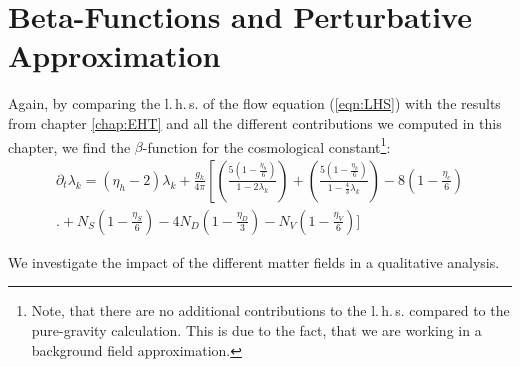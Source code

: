\section{Beta-Functions and Perturbative Approximation}
Again, by comparing the l.\,h.\,s. of the flow equation (\ref{eqn:LHS}) with the results from chapter \ref{chap:EHT} and all the different contributions we computed in this chapter, we find the $\beta$-function for the cosmological constant\footnote{Note, that there are no additional contributions to the l.\,h.\,s. compared to the pure-gravity calculation. This is due to the fact, that we are working in a background field approximation.}:
\begin{equation}
\begin{aligned}
	\partial_t\lambda_k = \left(\eta_h - 2\right)\lambda_k + \frac{g_k}{4\pi}\left[\left(\frac{5\left(1-\frac{\eta_h}{6}\right)}{1-2\lambda_k}\right) + \left(\frac{5\left(1-\frac{\eta_h}{6}\right)}{1-\frac{4}{3}\lambda_k}\right) - 8\left(1-\frac{\eta_c}{6}\right)\right. \\[10pt] 
	\Biggl. + N_S\left(1-\frac{\eta_S}{6}\right) - 4N_D\left(1-\frac{\eta_D}{3}\right) - N_V\left(1- \frac{\eta_V}{6}\right)\Biggr]
\end{aligned}
\end{equation}




We investigate the impact of the different matter fields in a qualitative analysis.  

 

